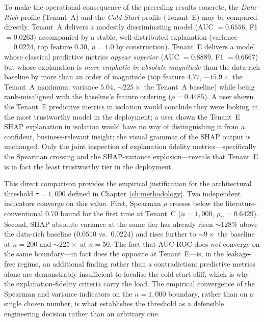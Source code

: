 To make the operational consequence of the preceding results concrete, the
\emph{Data-Rich} profile (Tenant~A) and the \emph{Cold-Start} profile
(Tenant~E) may be compared directly. Tenant~A delivers a modestly
discriminating model (AUC $= 0.6556$, F1 $= 0.0263$) accompanied by a
stable, well-distributed explanation (variance $= 0.0224$, top feature
$0.30$, $\rho = 1.0$ by construction). Tenant~E delivers a model whose
classical predictive metrics \emph{appear superior} (AUC $= 0.8889$,
F1 $= 0.6667$) but whose explanation is \emph{more emphatic in absolute
magnitude} than the data-rich baseline by more than an order of magnitude
(top feature $4.77$, $\sim\!15.9\times$ the Tenant~A maximum; variance
$5.04$, $\sim\!225\times$ the Tenant~A baseline) while being rank-misaligned
with the baseline's feature ordering ($\rho = 0.4485$). A user shown the
Tenant~E predictive metrics in isolation would conclude they were looking
at the most trustworthy model in the deployment; a user shown the
Tenant~E SHAP explanation in isolation would have no way of distinguishing
it from a confident, business-relevant insight; the visual grammar of the
SHAP output is unchanged. Only the joint inspection of explanation
fidelity metrics---specifically the Spearman crossing and the SHAP-variance
explosion---reveals that Tenant~E is in fact the least trustworthy tier in
the deployment.

This direct comparison provides the empirical justification for the
architectural threshold $\tau = 1{,}000$ defined in
Chapter~\ref{ch:methodology}. Two independent indicators converge on this
value. First, Spearman $\rho$ crosses below the literature-conventional
$0.70$ bound for the first time at Tenant~C ($n = 1{,}000$,
$\rho_C = 0.6429$). Second, SHAP absolute variance at the same tier has
already risen $\sim\!128\%$ above the data-rich baseline
($0.0510$ vs.\ $0.0224$) and rises further to $\sim\!9\times$ the baseline
at $n = 200$ and $\sim\!225\times$ at $n = 50$. The fact that AUC-ROC does
\emph{not} converge on the same boundary---in fact does the opposite at
Tenant~E---is, in the leakage-free regime, an additional finding rather
than a contradiction: predictive metrics alone are demonstrably insufficient
to localise the cold-start cliff, which is why the explanation-fidelity
criteria carry the load. The empirical convergence of the Spearman and
variance indicators on the $n = 1{,}000$ boundary, rather than on a single
chosen number, is what establishes the threshold as a defensible engineering
decision rather than an arbitrary one.

